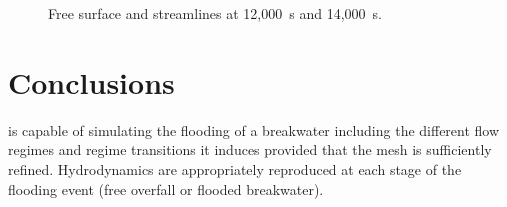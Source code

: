 \begin{figure}[H]
\begin{minipage}[t]{0.5\textwidth}
 \centering
\end{minipage}
\begin{minipage}[t]{0.5\textwidth}
 \centering
\end{minipage}
\caption{Free surface and streamlines at 12,000~s and 14,000~s.}
\label{fig:digue:FSStream}
\end{figure}

\section{Conclusions}

 is capable of simulating the flooding of a breakwater
including the different flow regimes and regime transitions
it induces provided that the mesh is sufficiently refined.
Hydrodynamics are appropriately reproduced at each stage
of the flooding event (free overfall or flooded breakwater).

